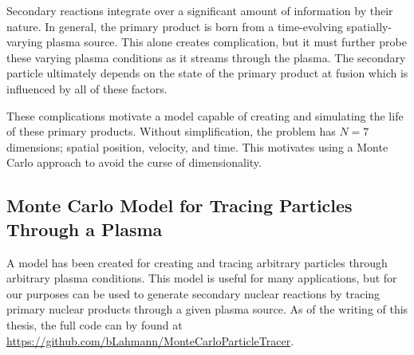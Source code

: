 Secondary reactions integrate over a significant amount of information by their nature. In general, the primary product is born from a time-evolving spatially-varying plasma source. This alone creates complication, but it must further probe these varying plasma conditions as it streams through the plasma. The secondary particle ultimately depends on the state of the primary product at fusion which is influenced by all of these factors.

These complications motivate a model capable of creating and simulating the life of these primary products. Without simplification, the problem has $N=7$ dimensions; spatial position, velocity, and time. This motivates using a Monte Carlo approach to avoid the curse of dimensionality. 

\subsection{Monte Carlo Model for Tracing Particles Through a Plasma}

	A model has been created for creating and tracing arbitrary particles through arbitrary plasma conditions. This model is useful for many applications, but for our purposes can be used to generate secondary nuclear reactions by tracing primary nuclear products through a given plasma source. As of the writing of this thesis, the full code can by found at \url{https://github.com/bLahmann/MonteCarloParticleTracer}.
	
